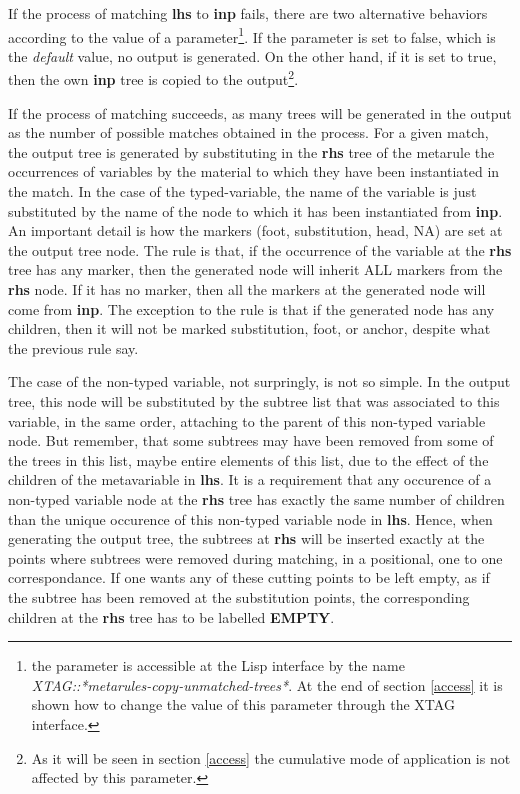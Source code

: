 If the process of matching {\bf lhs} to {\bf inp} fails, there are two 
alternative behaviors according to the value of a parameter\footnote{the
parameter is accessible at the Lisp interface by the name 
{\it XTAG::*metarules-copy-unmatched-trees*}.
At the end of section \ref{access} it is shown how to change the value
of this parameter through the XTAG interface.}. 
If the parameter is set to false, which is the {\it default} value, 
no output is generated. 
On the other hand, if 
it is set to true, then the own {\bf inp} tree is copied to the 
output\footnote{As it will be seen in section \ref{access} the cumulative
mode of application is not affected by this parameter.}.

If the process of matching succeeds, as many trees will be generated in the
output as the number of possible matches obtained in the process. For a 
given match, the output tree is generated by substituting in the {\bf rhs} tree
of the metarule the occurrences of variables by the material to which they have
been instantiated in the match. In the case of the typed-variable,
the name of the variable is just substituted by the name of the node to which
it has been instantiated from {\bf inp}. An important detail is how the
markers (foot, substitution, head, NA) are set at the output tree 
node. The rule is that, if the occurrence of the variable at the {\bf rhs}
tree has any marker, then the generated node will inherit ALL 
markers from the {\bf rhs} node. If it has no marker, then all the markers 
at the generated node will come from {\bf inp}. The exception to the rule is 
that if the generated node has any children, then it will not be marked
substitution, foot, or anchor, despite what the previous rule say.

The case of the non-typed variable, not surpringly, is not so simple. 
In the output tree, this node
will be substituted by the subtree list that was associated to this variable,
in the same order, attaching to the parent of this non-typed variable node.
But remember, that some subtrees may have been removed from some of the trees
in this list, maybe entire elements of this list, due to the effect of the
children of the metavariable in {\bf lhs}. 
It is a 
requirement that any occurence of a non-typed variable node at the {\bf rhs}
tree has exactly the same number of children than the unique occurence of
this non-typed variable node in {\bf lhs}. Hence, when generating the output
tree, the subtrees at {\bf rhs}
will be inserted exactly at the points where subtrees were removed during 
matching, in a positional, one to one correspondance. If one wants any
of these cutting points to be left empty, as if the subtree has been removed
at the substitution points, the corresponding children at the {\bf rhs} tree
has to be labelled {\bf EMPTY}.

